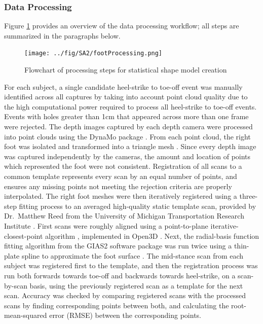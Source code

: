 \documentclass[defaultstyle,11pt]{comps}
\begin{document}
\hypertarget{data-processing}{%
\subsubsection{Data Processing}\label{data-processing}}

Figure \ref{fig:dataflow} provides an overview of the data processing workflow; all steps are summarized in the paragraphs below.

\begin{figure}
\hypertarget{fig:dataflow}{%
\centering
\texttt{[image: ../fig/SA2/footProcessing.png]}
\caption{Flowchart of processing steps for statistical shape model creation}\label{fig:dataflow}
}
\end{figure}

For each subject, a single candidate heel-strike to toe-off event was manually identified across all captures by taking into account point cloud quality due to the high computational power required to process all heel-strike to toe-off events.
Events with holes greater than 1cm that appeared across more than one frame were rejected.
The depth images captured by each depth camera were processed into point clouds using the DynaMo package \citep{Boppana2019}.
From each point cloud, the right foot was isolated and transformed into a triangle mesh \citep{Rusu2011, Fischler1981, Bernardini1999, Zhou2018}.
Since every depth image was captured independently by the cameras, the amount and location of points which represented the foot were not consistent.
Registration of all scans to a common template represents every scan by an equal number of points, and ensures any missing points not meeting the rejection criteria are properly interpolated.
The right foot meshes were then iteratively registered using a three-step fitting process to an averaged high-quality static template scan, provided by Dr.~Matthew Reed from the University of Michigan Transportation Research Institute \citep{Reed2013}.
First scans were roughly aligned using a point-to-plane iterative-closest-point algorithm \citep{Chen1992}, implemented in Open3D \citep{Zhou2018}.
Next, the radial-basis function fitting algorithm from the GIAS2 software package \citep{Zhang2016} was run twice using a thin-plate spline to approximate the foot surface \citep{Park2015a, Kim2016}.
The mid-stance scan from each subject was registered first to the template, and then the registration process was run both forwards towards toe-off and backwards towards heel-strike, on a scan-by-scan basis, using the previously registered scan as a template for the next scan.
Accuracy was checked by comparing registered scans with the processed scans by finding corresponding points between both, and calculating the root-mean-squared error (RMSE) between the corresponding points.
\end{document}

